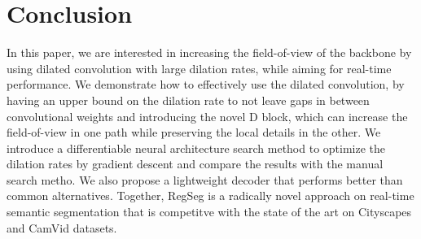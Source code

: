 \documentclass[10pt,twocolumn,letterpaper]{article}
\begin{document}
\section{Conclusion}
In this paper, we are interested in increasing the field-of-view of the backbone by using dilated convolution with large dilation rates, while aiming for real-time performance. We demonstrate how to effectively use the dilated convolution, by having an upper bound on the dilation rate to not leave gaps in between convolutional weights and introducing the novel D block, which can increase the field-of-view in one path while preserving the local details in the other. We introduce a differentiable neural architecture search method to optimize the dilation rates by gradient descent and compare the results with the manual search metho. We also propose a lightweight decoder that performs better than common alternatives. Together, RegSeg is a radically novel approach on real-time semantic segmentation that is competitve with the state of the art on Cityscapes and CamVid datasets.


{\small


}
\end{document}
